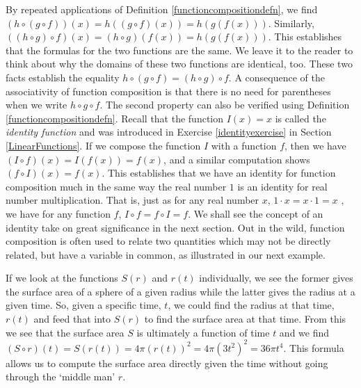 \pagebreak

By repeated applications of Definition \ref{functioncompositiondefn}, we find  $(h \circ (g \circ f))(x) = h((g \circ f)(x)) = h(g(f(x)))$.  Similarly, $((h \circ g) \circ f)(x) = (h \circ g)(f(x)) = h(g(f(x)))$.  This establishes that the formulas for the two functions are the same.  We leave it to the reader to think about why the domains of these two functions are identical, too.  These two facts establish the equality $h \circ (g \circ f) = (h \circ g) \circ f$.  A consequence of the associativity of function composition is that there is no need for parentheses when we write $h \circ g \circ f$. The second property can also be verified using Definition \ref{functioncompositiondefn}.  Recall that the function $I(x) = x$ is called the  \textit{identity function} and was introduced in Exercise  \ref{identityexercise} in Section \ref{LinearFunctions}.  If we compose the function $I$ with a function $f$, then we have $(I \circ f)(x) = I(f(x)) = f(x)$, and a similar computation shows $(f\circ I)(x) = f(x)$. This establishes that we have an identity for function composition much in the same way the real number $1$ is an identity for real number multiplication. That is, just as for any real number $x$, $1 \cdot x = x \cdot 1 = x$ , we have for any function $f$, $ I \circ f = f \circ I =f$.  We shall see the concept of an identity take on great significance in the next section.  Out in the wild, function composition is often used to relate two quantities which may not be directly related, but have a variable in common, as illustrated in our next example.

\medskip

{If we look at the functions $S(r)$ and $r(t)$ individually, we see the former gives the surface area of a sphere of a given radius while the latter gives the radius at a given time.    So, given a specific time, $t$, we could find the radius at that time, $r(t)$ and feed that into $S(r)$ to find the surface area at that time.  From this we see that the surface area $S$ is ultimately a function of time $t$ and we find $(S \circ r)(t) = S(r(t)) = 4 \pi (r(t))^2 = 4 \pi \left(3t^2\right)^2 = 36 \pi t^{4}$.  This formula allows us to compute the surface area directly given the time without going through the `middle man' $r$. }

